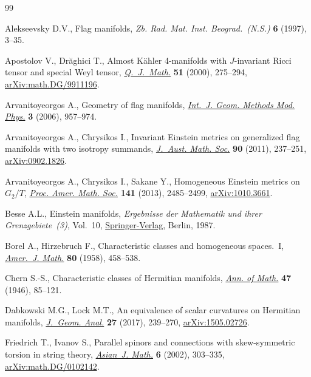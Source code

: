 \documentclass[pdftex]{sigma}%
\numberwithin{equation}{section}
\begin{document}
\begin{thebibliography}{99}
\footnotesize\itemsep=0pt

Alekseevsky D.V., Flag manifolds, \textit{Zb. Rad. Mat. Inst. Beograd.~(N.S.)}
 \textbf{6} (1997), 3--35.

Apostolov V., Dr\u{a}ghici T., Almost {K}\"ahler 4-manifolds with
 {$J$}-invariant {R}icci tensor and special {W}eyl tensor,
 \href{https://doi.org/10.1093/qjmath/51.3.275}{\textit{Q.~J.~Math.}} \textbf{51} (2000), 275--294, \href{https://arxiv.org/abs/math.DG/9911196}{arXiv:math.DG/9911196}.

Arvanitoyeorgos A., Geometry of flag manifolds, \href{https://doi.org/10.1142/S0219887806001399}{\textit{Int.~J. Geom. Methods
 Mod. Phys.}} \textbf{3} (2006), 957--974.

Arvanitoyeorgos A., Chrysikos I., Invariant {E}instein metrics on generalized
 flag manifolds with two isotropy summands, \href{https://doi.org/10.1017/S1446788711001303}{\textit{J.~Aust. Math. Soc.}}
 \textbf{90} (2011), 237--251, \href{https://arxiv.org/abs/0902.1826}{arXiv:0902.1826}.

Arvanitoyeorgos A., Chrysikos I., Sakane Y., Homogeneous {E}instein metrics on
 {$G_2/T$}, \href{https://doi.org/10.1090/S0002-9939-2013-11682-5}{\textit{Proc. Amer. Math. Soc.}} \textbf{141} (2013), 2485--2499,
 \href{https://arxiv.org/abs/1010.3661}{arXiv:1010.3661}.

Besse A.L., Einstein manifolds, \textit{Ergebnisse der Mathematik und ihrer
 Grenzgebiete~(3)}, Vol.~10, \href{https://doi.org/10.1007/978-3-540-74311-8}{Springer-Verlag}, Berlin, 1987.

Borel A., Hirzebruch F., Characteristic classes and homogeneous spaces.~{I},
 \href{https://doi.org/10.2307/2372795}{\textit{Amer.~J. Math.}} \textbf{80} (1958), 458--538.

Chern S.-S., Characteristic classes of {H}ermitian manifolds, \href{https://doi.org/10.2307/1969037}{\textit{Ann. of
 Math.}} \textbf{47} (1946), 85--121.

Dabkowski M.G., Lock M.T., An equivalence of scalar curvatures on {H}ermitian
 manifolds, \href{https://doi.org/10.1007/s12220-016-9680-4}{\textit{J.~Geom. Anal.}} \textbf{27} (2017), 239--270,
 \href{https://arxiv.org/abs/1505.02726}{arXiv:1505.02726}.

Friedrich T., Ivanov S., Parallel spinors and connections with skew-symmetric
 torsion in string theory, \href{https://doi.org/10.4310/AJM.2002.v6.n2.a5}{\textit{Asian~J. Math.}} \textbf{6} (2002),
 303--335, \href{https://arxiv.org/abs/math.DG/0102142}{arXiv:math.DG/0102142}.


\end{thebibliography}
\end{document}
